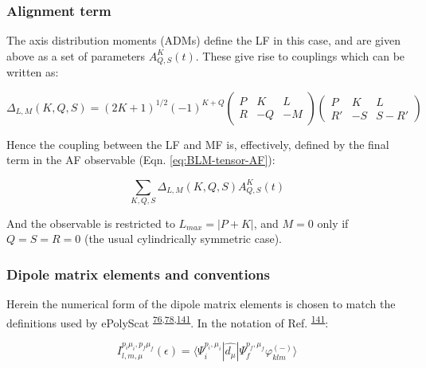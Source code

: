 \documentclass[10pt]{article}
\begin{document}
\subsubsection{Alignment term\label{alignment-term}}

The axis distribution moments (ADMs) define the LF in this case, and are given above as a set of parameters $A_{Q,S}^{K}(t)$. These give rise to couplings which can be written as:

\begin{equation}
\Delta_{L,M}(K,Q,S)=(2K+1)^{1/2}(-1)^{K+Q}\left(\begin{array}{ccc}
P & K & L\\
R & -Q & -M
\end{array}\right)\left(\begin{array}{ccc}
P & K & L\\
R' & -S & S-R'
\end{array}\right)
\label{eq:delta-func-defn}
\end{equation}

Hence the coupling between the LF and MF is, effectively, defined by the final term in the AF observable (Eqn. \ref{eq:BLM-tensor-AF}):

\begin{equation}
\sum_{K,Q,S}\Delta_{L,M}(K,Q,S)A_{Q,S}^{K}(t)
\end{equation}

And the observable is restricted to $L_{max}=|P+K|$, and $M=0$ only if  $Q=S=R=0$ (the usual cylindrically symmetric case).

\subsubsection{Dipole matrix elements and conventions\label{sec:mat-ele-conventions}}


Herein the numerical form of the dipole matrix elements is chosen to match the definitions used by ePolyScat \textsuperscript{\hyperref[csl:76]{76},\hyperref[csl:78]{78},\hyperref[csl:141]{141}}. In the notation of Ref. \textsuperscript{\hyperref[csl:141]{141}}:

\begin{equation}
I_{l,m,\mu}^{p_{i}\mu_{i},p_{f}\mu_{f}}(\epsilon)=\langle\Psi_{i}^{p_{i},\mu_{i}}|\hat{d_{\mu}}|\Psi_{f}^{p_{f},\mu_{f}}\varphi_{klm}^{(-)}\rangle\label{eq:eps-I}
\end{equation}
\end{document}
